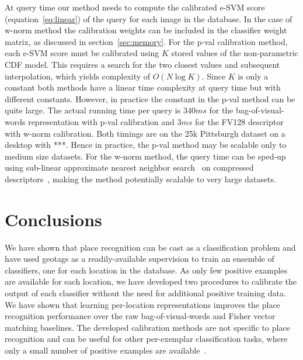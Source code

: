 \textcolor{petr}{
    At query time our method needs to compute the calibrated e-SVM score (equation~\eqref{eq:linear}) of the query for each image in the database. In the case of w-norm method the calibration weights can be included in the classifier weight matrix, as discussed in section~\ref{sec:memory}. For the p-val calibration method, each e-SVM score must be calibrated using $K$ stored values of the non-parametric CDF model. This requires a search for the two closest values and subsequent interpolation, which yields complexity of $O(N\log{K})$. Since $K$ is only a constant both methods have a linear time complexity at query time but with different constants. However, in practice the constant in the p-val method can be quite large. The actual running time per query is $340ms$ for the bag-of-visual-words representation with p-val calibration and $3ms$ for the FV128 descriptor with w-norm calibration. Both timings are on the 25k Pittsburgh dataset on a desktop with ***.   Hence in practice, the p-val method may be scalable only to medium size datasets. For the w-norm method, the query time can be sped-up using sub-linear approximate nearest neighbor search~\cite{Flann2014} on compressed descriptors~\cite{Jegou11}, making the method potentially scalable to very large datasets.
}

\section{Conclusions}
We have shown that place recognition can be cast as a classification problem and have used geotags as a readily-available supervision to
train an ensemble of classifiers, one for each location in the database. As only few positive examples are available for each
location, we have developed two procedures to calibrate the output of each classifier without the need for additional positive training
data. We have shown that learning per-location representations improves the place recognition performance over the raw bag-of-visual-words and
Fisher vector matching baselines. The developed calibration methods are not specific to place recognition and can be useful for other
per-exemplar classification tasks, where only a small number of positive examples are available~\cite{Malisiewicz11}.



